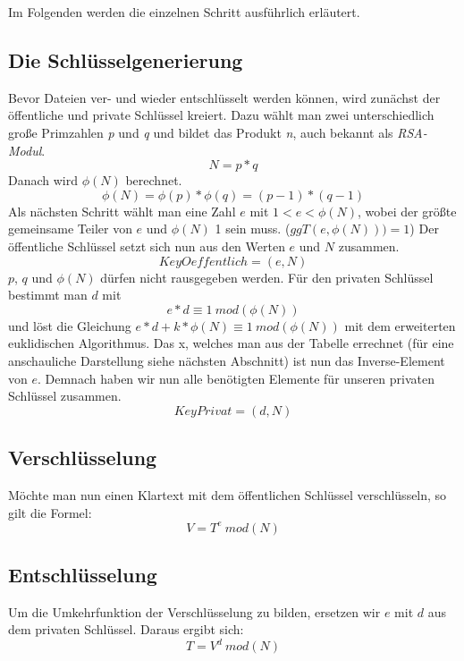 Im Folgenden werden die einzelnen Schritt ausführlich erläutert.
  \subsection{Die Schlüsselgenerierung}
  Bevor Dateien ver- und wieder entschlüsselt werden können, wird zunächst der
  öffentliche und private Schlüssel kreiert. Dazu wählt man zwei
  unterschiedlich große Primzahlen \emph{p} und \emph{q} und bildet das Produkt
  \emph{n}, auch bekannt als \emph{RSA-Modul}.
  \begin{displaymath}
  N = p * q
  \end{displaymath}
  Danach wird $\phi(N)$ berechnet.
  \begin{displaymath}
  \phi(N) = \phi(p) * \phi(q) = (p-1) * (q-1)
  \end{displaymath}
  Als nächsten Schritt wählt man eine Zahl $e$ mit $1<e<\phi(N)$, wobei der
  größte gemeinsame Teiler von $e$ und $\phi(N)$ 1 sein muss. ($ggT(e,
  \phi(N)))=1$)
  Der öffentliche Schlüssel setzt sich nun aus den Werten $e$ und $N$ zusammen.
  \begin{displaymath}
  KeyOeffentlich = (e,N)
  \end{displaymath} 
  $p$, $q$ und $\phi(N)$
  dürfen nicht rausgegeben werden. \newline\newline
  Für den privaten Schlüssel bestimmt man $d$ mit 
  \begin{displaymath}
  e*d \equiv 1 \ mod(\phi(N))
  \end{displaymath}
  und löst die Gleichung $e*d+k*\phi(N)\equiv 1 \ mod(\phi(N))$ mit dem
  erweiterten euklidischen Algorithmus. Das x, welches man aus der Tabelle
  errechnet (für eine anschauliche Darstellung siehe nächsten Abschnitt) ist nun
  das Inverse-Element von $e$. Demnach haben wir nun alle benötigten Elemente
  für unseren privaten Schlüssel zusammen.
  \begin{displaymath}
  KeyPrivat = (d, N)
  \end{displaymath}
  \subsection{Verschlüsselung}
  Möchte man nun einen Klartext mit dem öffentlichen Schlüssel verschlüsseln, so
  gilt die Formel:
  \begin{displaymath}
  V = T^e \ mod(N)
  \end{displaymath}
  \subsection{Entschlüsselung}
  Um die Umkehrfunktion der Verschlüsselung zu bilden, ersetzen wir $e$ mit $d$
  aus dem privaten Schlüssel. Daraus ergibt sich:
  \begin{displaymath}
  T = V^d \ mod(N)
  \end{displaymath}
